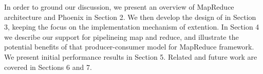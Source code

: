In order to ground our discussion, we present an overview
of MapReduce architecture and Phoenix in Section 2. 
We then develop the design of \myth in Section 3, 
keeping the focus on the implementation mechanism of extention. 
In Section 4 we describe our support for pipelineing map and reduce,
and illustrate the potential benefits of that producer-consumer model for MapReduce framework. 
We present initial performance results in Section 5. 
Related and future work are covered in Sections 6 and 7.


